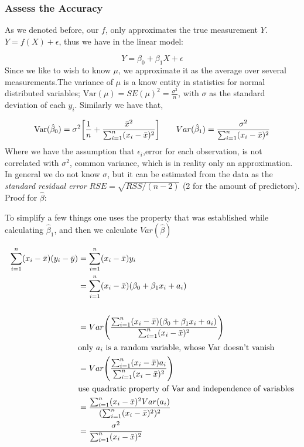 \documentclass{article}
\begin{document}
\subsubsection{Assess the Accuracy}
As we denoted before, our $f$, only approximates the true measurement $Y$. $Y = f(X) + \epsilon$, thus we have in the linear model:

$$ Y = \beta _0 + \beta_1 X + \epsilon$$
Since we like to wish to know $\mu$, we approximate it as the average over several measurements.The variance of $\mu$ is a know entity in statistics for normal distributed variables; $\text{Var}(\mu)=SE(\mu)^2=\frac{\sigma^2}{n}$, with $\sigma$ as the standard deviation of each $y_i$. Similarly we have that,

$$\text{Var}(\hat\beta_0)=\sigma^2 \bigg{[}  \frac{1}{n} + \frac{\bar x^2}{\sum_{i=1}^n(x_i-\bar x)^2} \bigg{]}  \quad \quad Var(\hat\beta_1)= \frac{\sigma^2}{\sum_{i=1}^n(x_i-\bar x)^2} $$
Where we have the assumption that $\epsilon_i$,error for each observation, is not correlated with $\sigma^2$, common variance, which is in reality only an approximation. In general we do not know $\sigma$, but it can be estimated from the data as the \textit{standard residual error} $RSE = \sqrt{RSS/(n-2)}$ (2 for the amount of predictors). Proof for $\hat{\beta}$:

To simplify a few things one uses the property that was established while calculating $\hat{\beta}_1$, and then we calculate $Var(\hat{\beta})$

\begin{align*}
  \sum_{i=1}^{n}(x_i-\bar{x})(y_i-\bar{y}) & = \sum_{i=1}^{n}(x_i-\bar{x})y_{i} \\
  &=\sum_{i=1}^{n}(x_i-\bar{x})(\beta_0 + \beta_1 x_i + a_i)\\ 
  \\
  &=Var \Bigg{(} \frac{\sum_{i=1}^n(x_i-\bar x)(\beta_0 + \beta_1 x_i + a_i)}{\sum_{i=1}^n(x_i - \bar x)^2}\Bigg{)}\\ 
  & \text{only $a_i$ is a random variable, whose Var doesn't vanish}\\
  &= Var \Bigg{(} \frac{\sum_{i=1}^n(x_i-\bar x)a_i}{\sum_{i=1}^n(x_i - \bar x)^2}\Bigg{)}\\
  &\text{use quadratic property of Var and independence of variables}\\
  &=\frac{\sum_{i=1}^n(x_i - \bar x)^2 Var(a_i)}{(\sum_{i=1}^n(x_i - \bar x)^2)^2}\\\
  &=\frac{\sigma^2}{\sum_{i=1}^n(x_i - \bar x)^2}
\end{align*}
\end{document}
